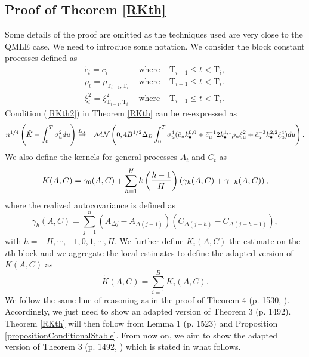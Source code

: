 \documentclass[11pt]{article}
\numberwithin{equation}{section}
\newcommand{\Tau}{\mathrm{T}}
\theoremstyle{plain}
\theoremstyle{remark}
\begin{document}
\subsection{Proof of Theorem \ref{RKth}}
Some details of the proof are omitted as the techniques used are very close to the QMLE case. We need to introduce some notation. We consider the block constant processes defined as
\begin{eqnarray*}
\tilde{c}_t  =  c_i &\text{ where } &\Tau_{i-1} \leq t < \Tau_{i},\\
\rho_t  =  \rho_{\Tau_{i-1}, \Tau_i} &\text{ where } &\Tau_{i-1} \leq t < \Tau_{i}.\\
\xi_t^2  =  \xi_{\Tau_{i-1}, \Tau_i}^2 &\text{ where } &\Tau_{i-1} \leq t < \Tau_{i}.
\end{eqnarray*}
Condition (\ref{RKth2}) in Theorem \ref{RKth} can be re-expressed as
\begin{eqnarray*}
n^{1/4} \left( \tilde{K} - \int_0^T \sigma_u^2 du \right) &  \overset{L_X}{\rightarrow} & {\cal M}{\cal N} \left(0, 4 B^{1/2} \Delta_B \int_0^T \sigma_u^4 (\tilde{c}_u k_{\bullet}^{0,0} + \tilde{c}_u^{-1} 2 k_{\bullet}^{1,1} \rho_u \xi_u^2 + \tilde{c}_u^{-3} k_{\bullet}^{2,2} \xi_u^4 )du \right).
\end{eqnarray*}
We also define the kernels for general processes $A_t$ and $C_t$ as
$$K(A,C) = \gamma_0 (A,C) + \sum_{h=1}^{H} k \left( \frac{h-1}{H} \right) \left( \gamma_h (A,C) + \gamma_{-h} (A,C) \right),$$ 
where the realized autocovariance is defined as
$$\gamma_h (A,C) = \sum_{j=1}^{n} (A_{\Delta j} - A_{\Delta (j-1)}) (C_{\Delta (j - h)} - C_{\Delta (j-h-1)}),$$
with $h = -H, \cdots, -1, 0, 1 , \cdots, H$. We further define $K_i (A,C)$ the estimate on the $i$th block and we aggregate the local estimates to define the adapted version of $K(A,C)$ as 
$$\tilde{K}(A,C) = \sum_{i=1}^{B} K_i(A,C).$$ 
We follow the same line of reasoning as in the proof of Theorem 4 (p. 1530, \cite{barndorff2008designing}). Accordingly, we just need to show an adapted version of Theorem 3 (p. 1492). Theorem \ref{RKth} will then follow from Lemma 1 (p. 1523) and Proposition \ref{propositionConditionalStable}. From now on, we aim to show the adapted version of Theorem 3 (p. 1492, \cite{barndorff2008designing}) which is stated in what follows.
\end{document}
